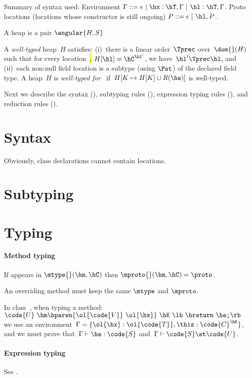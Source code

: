 \documentclass[10pt,a4paper]{article}
\begin{document}
Summary of syntax used:
Environment $\Gamma ::= \epsilon ~|~ \hx:\hT,\Gamma ~|~ \hl:\hT,\Gamma$.
Proto locations (locations whose constructor is still ongoing) $P::= \epsilon ~|~ \hl,P$.




A heap is a pair $\angular{H,S}$

A \emph{well-typed} heap~$H$ satisfies:
    (i)~there is a linear order~$\Tprec$ over~$\dom{}(H)$ such that for every location~\hl, $H[\hl]=\hC^{\hl'}$,
        we have~$\hl' \Tprec \hl$,
        and
    (ii)~each non-null field location is a subtype (using $\Pst$) of the declared field type.
A heap~$H$ is \emph{well-typed for~\he} if~$H[K \mapsto H[K]\cup R(\he)]$ is well-typed.

\begin{smaller}




\end{smaller}


Next we describe the syntax (),
    subtyping rules (),
    expression typing rules (),
    and reduction rules ().

\section{Syntax}
Obviously, class declarations cannot contain locations.

\section{Subtyping}


\section{Typing}
\paragraph{Method typing}
If \proto appears in $\mtype{}(\hm,\hC)$ then $\mproto{}(\hm,\hC)=\proto$.

An overriding method must keep the same $\mtype$ and $\mproto$.

In class~\hC, when typing a method:
        $\code{U} ~ \hm\hparen{\ol{\code{V}} ~ \ol{\hx}} ~ \hK~ \lb\ \hreturn ~ \he\texttt{;} \rb$\\
        we use an environment~$\Gamma=\{\ol{\hx}:\ol{\code{T}}, \this:\code{C}^\hK\}$,
        and we must prove that~$\Gamma \vdash \he:\code{S}$
        and~$\Gamma \vdash \code{S} \st \code{U}$.

\paragraph{Expression typing}
See .
\end{document}
